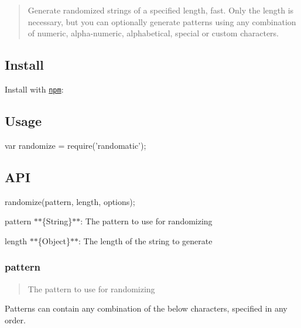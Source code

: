 \begin{quote}
Generate randomized strings of a specified length, fast. Only the length is necessary, but you can optionally generate patterns using any combination of numeric, alpha-\/numeric, alphabetical, special or custom characters. \end{quote}


\subsection*{Install}

Install with \href{https://www.npmjs.com/}{\tt npm}\+:




\subsection*{Usage}


\begin{DoxyCode}
var randomize = require('randomatic');
\end{DoxyCode}


\subsection*{A\+PI}


\begin{DoxyCode}
randomize(pattern, length, options);
\end{DoxyCode}



\begin{DoxyItemize}
\item {\ttfamily pattern} $\ast$$\ast$\{String\}$\ast$$\ast$\+: The pattern to use for randomizing
\item {\ttfamily length} $\ast$$\ast$\{Object\}$\ast$$\ast$\+: The length of the string to generate
\end{DoxyItemize}

\subsubsection*{pattern}

\begin{quote}
The pattern to use for randomizing \end{quote}


Patterns can contain any combination of the below characters, specified in any order.

